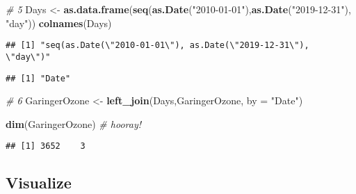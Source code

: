 \documentclass[
]{article}
\newenvironment{Shaded}{\begin{snugshade}}{\end{snugshade}}
\newcommand{\CharTok}[1]{\textcolor[rgb]{0.31,0.60,0.02}{#1}}
\newcommand{\CommentTok}[1]{\textcolor[rgb]{0.56,0.35,0.01}{\textit{#1}}}
\newcommand{\DataTypeTok}[1]{\textcolor[rgb]{0.13,0.29,0.53}{#1}}
\newcommand{\KeywordTok}[1]{\textcolor[rgb]{0.13,0.29,0.53}{\textbf{#1}}}
\newcommand{\NormalTok}[1]{#1}
\newcommand{\OperatorTok}[1]{\textcolor[rgb]{0.81,0.36,0.00}{\textbf{#1}}}
\newcommand{\StringTok}[1]{\textcolor[rgb]{0.31,0.60,0.02}{#1}}
\begin{document}
\begin{Shaded}
\begin{Highlighting}[]
\CommentTok{# 5}
\NormalTok{Days <-}\StringTok{ }\KeywordTok{as.data.frame}\NormalTok{(}\KeywordTok{seq}\NormalTok{(}\KeywordTok{as.Date}\NormalTok{(}\StringTok{"2010-01-01"}\NormalTok{),}\KeywordTok{as.Date}\NormalTok{(}\StringTok{"2019-12-31"}\NormalTok{), }\StringTok{"day"}\NormalTok{)) }
\KeywordTok{colnames}\NormalTok{(Days)}
\end{Highlighting}
\end{Shaded}

\begin{verbatim}
## [1] "seq(as.Date(\"2010-01-01\"), as.Date(\"2019-12-31\"), \"day\")"
\end{verbatim}

\begin{Shaded}
\end{Shaded}

\begin{verbatim}
## [1] "Date"
\end{verbatim}

\begin{Shaded}
\begin{Highlighting}[]
\CommentTok{# 6}
\NormalTok{GaringerOzone <-}\StringTok{ }\KeywordTok{left_join}\NormalTok{(Days,GaringerOzone, }\DataTypeTok{by =} \StringTok{"Date"}\NormalTok{)}

\KeywordTok{dim}\NormalTok{(GaringerOzone) }\CommentTok{# hooray!}
\end{Highlighting}
\end{Shaded}

\begin{verbatim}
## [1] 3652    3
\end{verbatim}

\hypertarget{visualize}{%
\subsection{Visualize}\label{visualize}}
\end{document}
